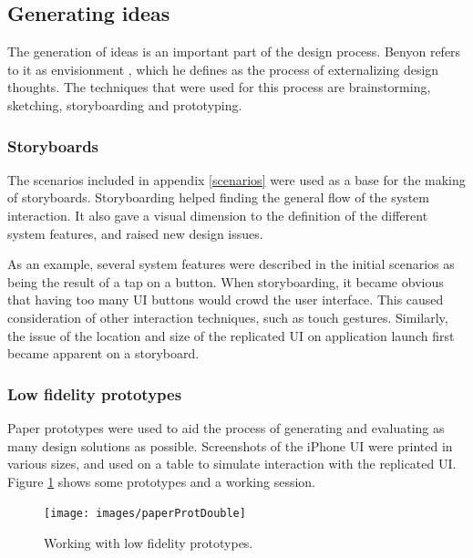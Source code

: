 \subsection{Generating ideas}

The generation of ideas is an important part of the design process.
Benyon refers to it as envisionment \citep{Benyon:2010}, which he defines as the process of externalizing design thoughts.
The techniques that were used for this process are brainstorming, sketching, storyboarding and prototyping.

\subsubsection{Storyboards}

The scenarios included in appendix \ref{scenarios} were used as a base for the making of storyboards.
Storyboarding helped finding the general flow of the system interaction.
It also gave a visual dimension to the definition of the different system features, and raised new design issues.

As an example, several system features were described in the initial scenarios as being the result of a tap on a button.
When storyboarding, it became obvious that having too many UI buttons would crowd the user interface.
This caused consideration of other interaction techniques, such as touch gestures.
Similarly, the issue of the location and size of the replicated UI on application launch first became apparent on a storyboard.

\subsubsection{Low fidelity prototypes}

Paper prototypes were used to aid the process of generating and evaluating as many design solutions as possible.
Screenshots of the iPhone UI \citep{iphone} were printed in various sizes, and used on a table to simulate interaction with the replicated UI.
Figure \ref{paperProt} shows some prototypes and a working session.

\begin{figure}[htb]
  \centering
    \texttt{[image: images/paperProtDouble]}
  \caption{Working with low fidelity prototypes.}
  \label{paperProt}
\end{figure}


